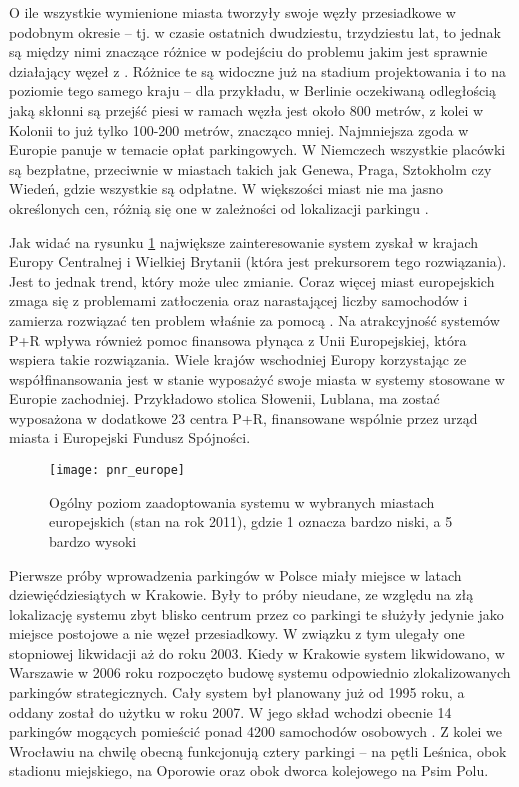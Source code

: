 \documentclass[twoside,12pt]{article}
\begin{document}
	O ile wszystkie wymienione miasta tworzyły swoje węzły przesiadkowe w podobnym okresie -- tj. w czasie ostatnich dwudziestu, trzydziestu lat, to jednak są między nimi znaczące różnice w podejściu do problemu jakim jest sprawnie działający węzeł z \pnr{}. Różnice te są widoczne już na stadium projektowania i to na poziomie tego samego kraju -- dla przykładu, w Berlinie oczekiwaną odległością jaką skłonni są przejść piesi w ramach węzła jest około 800 metrów, z kolei w Kolonii to już tylko 100-200 metrów, znacząco mniej. Najmniejsza zgoda w Europie panuje w temacie opłat parkingowych. W Niemczech wszystkie placówki \pnr{} są bezpłatne, przeciwnie w miastach takich jak Genewa, Praga, Sztokholm czy Wiedeń, gdzie wszystkie są odpłatne. W większości miast nie ma jasno określonych cen, różnią się one w zależności od lokalizacji parkingu \cite{eurotest}.
	
	Jak widać na rysunku \ref{pnr_europe} największe zainteresowanie system \pnr{} zyskał w krajach Europy Centralnej i Wielkiej Brytanii (która jest prekursorem tego rozwiązania). Jest to jednak trend, który może ulec zmianie. Coraz więcej miast europejskich zmaga się z problemami zatłoczenia oraz narastającej liczby samochodów i zamierza rozwiązać ten problem właśnie za pomocą \pnr{}. Na atrakcyjność systemów P+R wpływa również pomoc finansowa płynąca z Unii Europejskiej, która wspiera takie rozwiązania. Wiele krajów wschodniej Europy korzystając ze współfinansowania jest w stanie wyposażyć swoje miasta w systemy stosowane w Europie zachodniej. Przykładowo stolica Słowenii, Lublana, ma zostać wyposażona w dodatkowe 23 centra P+R, finansowane wspólnie przez urząd miasta i Europejski Fundusz Spójności. 
	
	\begin{figure}[H]
		\centering
		\texttt{[image: pnr\_europe]}\\
		\caption{Ogólny poziom zaadoptowania systemu \pnr{} w wybranych miastach europejskich (stan na rok 2011), gdzie 1 oznacza bardzo niski, a 5 bardzo wysoki}
		\label{pnr_europe}
	\end{figure}
	
	Pierwsze próby wprowadzenia parkingów \pnr{} w Polsce miały miejsce w latach dziewięćdziesiątych w Krakowie. Były to próby nieudane, ze względu na złą lokalizację systemu zbyt blisko centrum przez co parkingi te służyły jedynie jako miejsce postojowe a nie węzeł przesiadkowy. W związku z tym ulegały one stopniowej likwidacji aż do roku 2003. Kiedy w Krakowie system likwidowano, w Warszawie w 2006 roku rozpoczęto budowę systemu odpowiednio zlokalizowanych parkingów strategicznych. Cały system był planowany już od 1995 roku, a oddany został do użytku w roku 2007. W jego skład wchodzi obecnie 14 parkingów mogących pomieścić ponad 4200 samochodów osobowych \cite{rybczynska}. Z kolei we Wrocławiu na chwilę obecną funkcjonują cztery parkingi \pnr{} -- na pętli Leśnica, obok stadionu miejskiego, na Oporowie oraz obok dworca kolejowego na Psim Polu.
	
\end{document}
